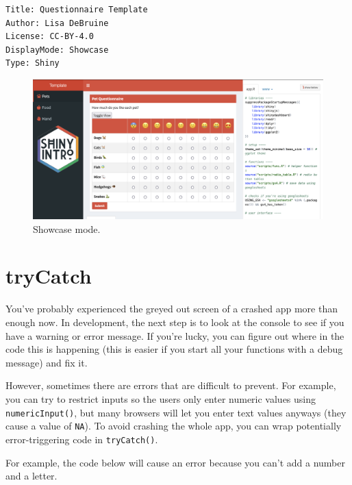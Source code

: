 \documentclass[
  oneside]{book}
\newenvironment{Shaded}{\begin{snugshade}}{\end{snugshade}}
\newcommand{\AttributeTok}[1]{\textcolor[rgb]{0.77,0.63,0.00}{#1}}
\newcommand{\DecValTok}[1]{\textcolor[rgb]{0.00,0.00,0.81}{#1}}
\newcommand{\FunctionTok}[1]{\textcolor[rgb]{0.00,0.00,0.00}{#1}}
\newcommand{\NormalTok}[1]{#1}
\newcommand{\OtherTok}[1]{\textcolor[rgb]{0.56,0.35,0.01}{#1}}
\newcommand{\SpecialCharTok}[1]{\textcolor[rgb]{0.00,0.00,0.00}{#1}}
\newcommand{\StringTok}[1]{\textcolor[rgb]{0.31,0.60,0.02}{#1}}
\begin{document}
\begin{verbatim}
Title: Questionnaire Template
Author: Lisa DeBruine
License: CC-BY-4.0
DisplayMode: Showcase
Type: Shiny
\end{verbatim}

\begin{figure}

{\centering \includegraphics[width=1\linewidth]{images/showcase_mode} 

}

\caption{Showcase mode.}\label{fig:showcase-mode}
\end{figure}

\hypertarget{trycatch}{%
\section{tryCatch}\label{trycatch}}

You've probably experienced the greyed out screen of a crashed app more than enough now. In development, the next step is to look at the console to see if you have a warning or error message. If you're lucky, you can figure out where in the code this is happening (this is easier if you start all your functions with a debug message) and fix it.

However, sometimes there are errors that are difficult to prevent. For example, you can try to restrict inputs so the users only enter numeric values using \texttt{numericInput}\texttt{()}, but many browsers will let you enter text values anyways (they cause a value of \texttt{NA}). To avoid crashing the whole app, you can wrap potentially error-triggering code in \texttt{tryCatch}\texttt{()}.

For example, the code below will cause an error because you can't add a number and a letter.

\begin{Shaded}
\end{Shaded}
\end{document}
